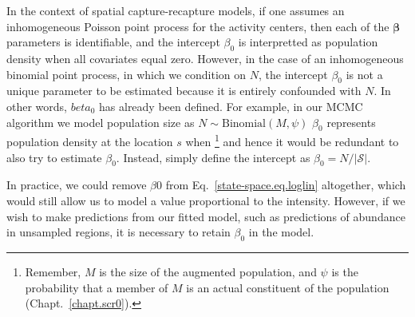 In the context of spatial capture-recapture models, if one assumes an
inhomogeneous Poisson point process for the activity centers, then
each of the $\bm \beta$ parameters is identifiable, and the intercept
$\beta_0$ is interpretted as population density when all covariates
equal zero. However, in the case of an inhomogeneous binomial point
process, in which we condition on $N$, the intercept $\beta_0$ is not a
unique parameter to be estimated because it is entirely confounded
with $N$. In other words, $beta_0$ has already been defined. For
example, in our MCMC algorithm we model population size as $N \sim
\text{Binomial}(M, \psi)$
$\beta_0$ represents population density at the location $s$ when
\footnote{Remember, $M$ is the size of the augmented population, and
$\psi$ is the probability that a member of $M$ is an actual
constituent of the population (Chapt.~\ref{chapt.scr0}).}
and hence it would be redundant to also try
to estimate $\beta_0$. Instead, simply define the intercept as
$\beta_0 = N/|\mathcal{S}|$. %

In practice, we could remove $\beta0$ from
Eq.~\ref{state-space.eq.loglin} altogether, which would still allow us
to model a value proportional to the intensity. However, if we wish to
make predictions from our fitted model, such as predictions of
abundance in unsampled regions, it is necessary to retain
$\beta_0$ in the model.

